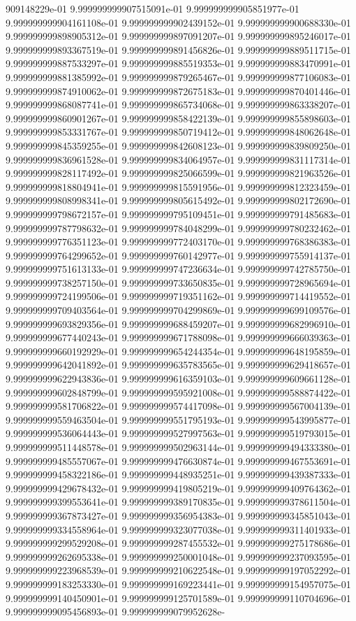 909148229e-01	9.999999999907515091e-01	9.999999999905851977e-01	9.999999999904161108e-01	9.999999999902439152e-01	9.999999999900688330e-01	9.999999999898905312e-01	9.999999999897091207e-01	9.999999999895246017e-01	9.999999999893367519e-01	9.999999999891456826e-01	9.999999999889511715e-01	9.999999999887533297e-01	9.999999999885519353e-01	9.999999999883470991e-01	9.999999999881385992e-01	9.999999999879265467e-01	9.999999999877106083e-01	9.999999999874910062e-01	9.999999999872675183e-01	9.999999999870401446e-01	9.999999999868087741e-01	9.999999999865734068e-01	9.999999999863338207e-01	9.999999999860901267e-01	9.999999999858422139e-01	9.999999999855898603e-01	9.999999999853331767e-01	9.999999999850719412e-01	9.999999999848062648e-01	9.999999999845359255e-01	9.999999999842608123e-01	9.999999999839809250e-01	9.999999999836961528e-01	9.999999999834064957e-01	9.999999999831117314e-01	9.999999999828117492e-01	9.999999999825066599e-01	9.999999999821963526e-01	9.999999999818804941e-01	9.999999999815591956e-01	9.999999999812323459e-01	9.999999999808998341e-01	9.999999999805615492e-01	9.999999999802172690e-01	9.999999999798672157e-01	9.999999999795109451e-01	9.999999999791485683e-01	9.999999999787798632e-01	9.999999999784048299e-01	9.999999999780232462e-01	9.999999999776351123e-01	9.999999999772403170e-01	9.999999999768386383e-01	9.999999999764299652e-01	9.999999999760142977e-01	9.999999999755914137e-01	9.999999999751613133e-01	9.999999999747236634e-01	9.999999999742785750e-01	9.999999999738257150e-01	9.999999999733650835e-01	9.999999999728965694e-01	9.999999999724199506e-01	9.999999999719351162e-01	9.999999999714419552e-01	9.999999999709403564e-01	9.999999999704299869e-01	9.999999999699109576e-01	9.999999999693829356e-01	9.999999999688459207e-01	9.999999999682996910e-01	9.999999999677440243e-01	9.999999999671788098e-01	9.999999999666039363e-01	9.999999999660192929e-01	9.999999999654244354e-01	9.999999999648195859e-01	9.999999999642041892e-01	9.999999999635783565e-01	9.999999999629418657e-01	9.999999999622943836e-01	9.999999999616359103e-01	9.999999999609661128e-01	9.999999999602848799e-01	9.999999999595921008e-01	9.999999999588874422e-01	9.999999999581706822e-01	9.999999999574417098e-01	9.999999999567004139e-01	9.999999999559463504e-01	9.999999999551795193e-01	9.999999999543995877e-01	9.999999999536064443e-01	9.999999999527997563e-01	9.999999999519793015e-01	9.999999999511448578e-01	9.999999999502963144e-01	9.999999999494333380e-01	9.999999999485557067e-01	9.999999999476630874e-01	9.999999999467553691e-01	9.999999999458322186e-01	9.999999999448935251e-01	9.999999999439387333e-01	9.999999999429678432e-01	9.999999999419805219e-01	9.999999999409764362e-01	9.999999999399553641e-01	9.999999999389170835e-01	9.999999999378611504e-01	9.999999999367873427e-01	9.999999999356954383e-01	9.999999999345851043e-01	9.999999999334558964e-01	9.999999999323077038e-01	9.999999999311401933e-01	9.999999999299529208e-01	9.999999999287455532e-01	9.999999999275178686e-01	9.999999999262695338e-01	9.999999999250001048e-01	9.999999999237093595e-01	9.999999999223968539e-01	9.999999999210622548e-01	9.999999999197052292e-01	9.999999999183253330e-01	9.999999999169223441e-01	9.999999999154957075e-01	9.999999999140450901e-01	9.999999999125701589e-01	9.999999999110704696e-01	9.999999999095456893e-01	9.999999999079952628e-